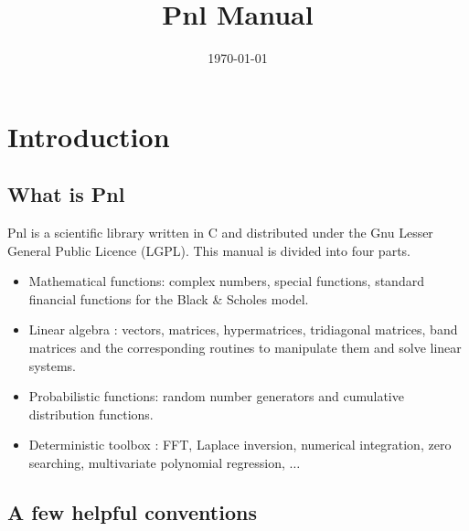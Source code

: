 \documentclass[a4paper,11pt,twoside]{article}
\title{Pnl Manual}
\date{\today}
\author{}
\begin{document}
\maketitle
\tableofcontents

\section{Introduction}
\subsection{What is Pnl}

Pnl is a scientific library written in C and distributed under
the Gnu Lesser General Public Licence (LGPL). This manual is divided into four
parts.
\begin{itemize}
\item Mathematical functions: complex numbers, special functions, standard
  financial functions for the Black \& Scholes model.
\item Linear algebra : vectors, matrices, hypermatrices, tridiagonal matrices,
  band matrices and the corresponding routines to manipulate them and solve linear systems.
\item Probabilistic functions: random number generators and  cumulative
  distribution functions.
\item Deterministic toolbox : FFT, Laplace inversion, numerical integration, zero searching,
  multivariate polynomial regression, $\dots$
\end{itemize}

\subsection{A few helpful conventions}
\end{document}
